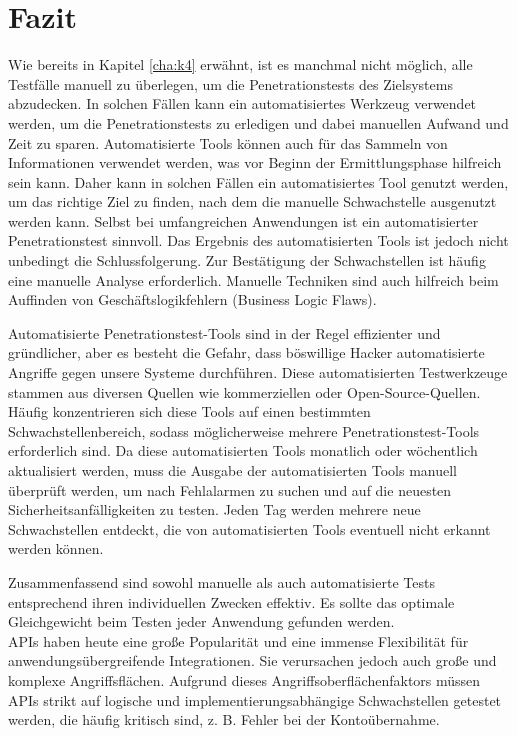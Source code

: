 \chapter{Fazit}
\label{cha:k7}


Wie bereits in Kapitel  \ref{cha:k4} erwähnt, ist es manchmal nicht möglich, alle Testfälle manuell zu überlegen, um die Penetrationstests des Zielsystems abzudecken. In solchen Fällen kann ein automatisiertes Werkzeug verwendet werden, um die Penetrationstests zu erledigen und dabei manuellen Aufwand und Zeit zu sparen. Automatisierte Tools können auch für das Sammeln von Informationen verwendet werden, was vor Beginn der Ermittlungsphase hilfreich sein kann. Daher kann in solchen Fällen ein automatisiertes Tool genutzt werden, um das richtige Ziel zu finden, nach dem die manuelle Schwachstelle ausgenutzt werden kann. Selbst bei umfangreichen Anwendungen ist ein automatisierter Penetrationstest sinnvoll. Das Ergebnis des automatisierten Tools ist jedoch nicht unbedingt die Schlussfolgerung. Zur Bestätigung der Schwachstellen ist häufig eine manuelle Analyse erforderlich. Manuelle Techniken sind auch hilfreich beim Auffinden von Geschäftslogikfehlern (Business Logic Flaws).

Automatisierte Penetrationstest-Tools sind in der Regel effizienter und gründlicher, aber es besteht die Gefahr, dass böswillige Hacker automatisierte Angriffe gegen unsere Systeme durchführen. Diese automatisierten Testwerkzeuge stammen aus diversen Quellen wie kommerziellen oder Open-Source-Quellen. Häufig konzentrieren sich diese Tools auf einen bestimmten Schwachstellenbereich, sodass möglicherweise mehrere Penetrationstest-Tools erforderlich sind. Da diese automatisierten Tools monatlich oder wöchentlich aktualisiert werden, muss die Ausgabe der automatisierten Tools manuell überprüft werden, um nach Fehlalarmen zu suchen und auf die neuesten Sicherheitsanfälligkeiten zu testen. Jeden Tag werden mehrere neue Schwachstellen entdeckt, die von automatisierten Tools eventuell nicht erkannt werden können.

Zusammenfassend sind sowohl manuelle als auch automatisierte Tests entsprechend ihren individuellen Zwecken effektiv. Es sollte das optimale Gleichgewicht beim Testen jeder Anwendung gefunden werden.\\


APIs haben heute eine große Popularität und eine immense Flexibilität für anwendungsübergreifende Integrationen. Sie verursachen jedoch auch große und komplexe Angriffsflächen. Aufgrund dieses Angriffsoberflächenfaktors müssen APIs strikt auf logische und implementierungsabhängige Schwachstellen getestet werden, die häufig kritisch sind, z. B. Fehler bei der Kontoübernahme.

